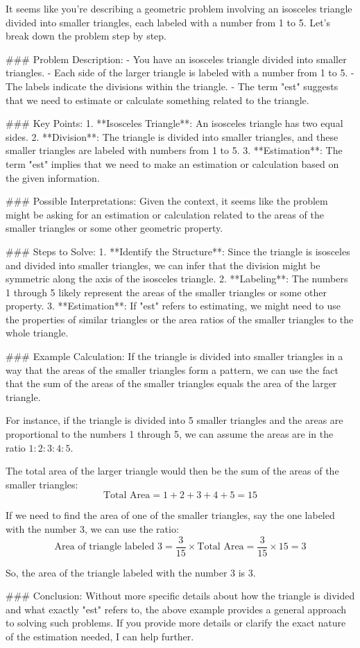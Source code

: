 It seems like you're describing a geometric problem involving an isosceles triangle divided into smaller triangles, each labeled with a number from 1 to 5. Let's break down the problem step by step.

### Problem Description:
- You have an isosceles triangle divided into smaller triangles.
- Each side of the larger triangle is labeled with a number from 1 to 5.
- The labels indicate the divisions within the triangle.
- The term "est" suggests that we need to estimate or calculate something related to the triangle.

### Key Points:
1. **Isosceles Triangle**: An isosceles triangle has two equal sides.
2. **Division**: The triangle is divided into smaller triangles, and these smaller triangles are labeled with numbers from 1 to 5.
3. **Estimation**: The term "est" implies that we need to make an estimation or calculation based on the given information.

### Possible Interpretations:
Given the context, it seems like the problem might be asking for an estimation or calculation related to the areas of the smaller triangles or some other geometric property.

### Steps to Solve:
1. **Identify the Structure**: Since the triangle is isosceles and divided into smaller triangles, we can infer that the division might be symmetric along the axis of the isosceles triangle.
2. **Labeling**: The numbers 1 through 5 likely represent the areas of the smaller triangles or some other property.
3. **Estimation**: If "est" refers to estimating, we might need to use the properties of similar triangles or the area ratios of the smaller triangles to the whole triangle.

### Example Calculation:
If the triangle is divided into smaller triangles in a way that the areas of the smaller triangles form a pattern, we can use the fact that the sum of the areas of the smaller triangles equals the area of the larger triangle.

For instance, if the triangle is divided into 5 smaller triangles and the areas are proportional to the numbers 1 through 5, we can assume the areas are in the ratio \(1:2:3:4:5\).

The total area of the larger triangle would then be the sum of the areas of the smaller triangles:
\[ \text{Total Area} = 1 + 2 + 3 + 4 + 5 = 15 \]

If we need to find the area of one of the smaller triangles, say the one labeled with the number 3, we can use the ratio:
\[ \text{Area of triangle labeled 3} = \frac{3}{15} \times \text{Total Area} = \frac{3}{15} \times 15 = 3 \]

So, the area of the triangle labeled with the number 3 is 3.

### Conclusion:
Without more specific details about how the triangle is divided and what exactly "est" refers to, the above example provides a general approach to solving such problems. If you provide more details or clarify the exact nature of the estimation needed, I can help further.
